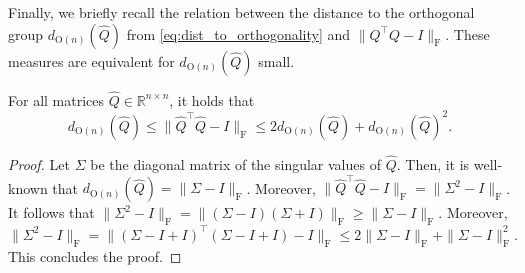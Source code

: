 \documentclass[10pt,twoside,dvipsnames]{siamart1116}
\numberwithin{algorithm}{section}
\numberwithin{equation}{section}
\newcommand{\new}[1]{#1}
\begin{document}
\new{Finally, we briefly recall the relation between the distance to the orthogonal group $d_{\mathrm{O}(n)}(\widehat{Q})$ from \eqref{eq:dist_to_orthogonality} and $\|Q^\top Q-I\|_\mathrm{F}$. These measures are equivalent for $d_{\mathrm{O}(n)}(\widehat{Q})$ small.
	\begin{lemma}\label{lem:ortho_measures}
For all matrices $\widehat{Q}\in\mathbb{R}^{n\times n}$, it holds that
\begin{equation*}
d_{\mathrm{O}(n)}(\widehat{Q})\leq \|\widehat{Q}^\top\widehat{Q}-I\|_\mathrm{F}\leq 2d_{\mathrm{O}(n)}(\widehat{Q}) + d_{\mathrm{O}(n)}(\widehat{Q})^2.
\end{equation*}
\end{lemma}	
\begin{proof}
Let $\Sigma$ be the diagonal matrix of the singular values of $\widehat{Q}$. Then, it is well-known that $ d_{\mathrm{O}(n)}(\widehat{Q})=\|\Sigma-I\|_\mathrm{F}$. Moreover, $\|\widehat{Q}^\top\widehat{Q}-I\|_\mathrm{F} = \|\Sigma^2-I\|_\mathrm{F}$.  It follows that $ \|\Sigma^2-I\|_\mathrm{F} = \|(\Sigma-I)(\Sigma+I)\|_\mathrm{F}\geq \|\Sigma-I\|_\mathrm{F}$. Moreover, 
\begin{equation*}
	\|\Sigma^2 - I\|_\mathrm{F}= \|(\Sigma - I +I)^\top(\Sigma - I +I) - I\|_\mathrm{F} \leq 2\|\Sigma - I\|_\mathrm{F} + \|\Sigma - I\|_\mathrm{F}^2.
\end{equation*}
This concludes the proof.
\end{proof}}
\end{document}
